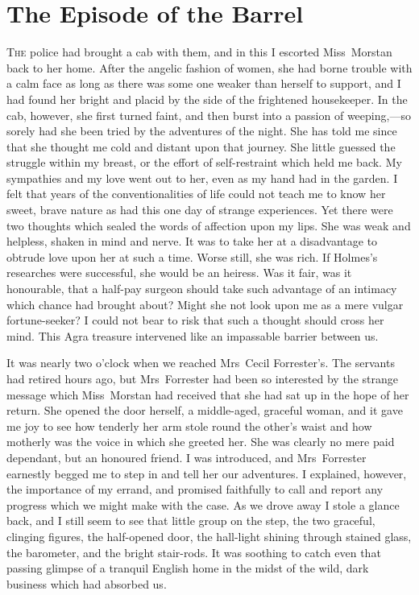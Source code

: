\chapter{The Episode of the Barrel}
\lettrine{T}{he} police had brought a cab with them, and in this I escorted Miss~Morstan back to her home. After the angelic fashion of women, she had borne trouble with a calm face as long as there was some one weaker than herself to support, and I had found her bright and placid by the side of the frightened housekeeper. In the cab, however, she first turned faint, and then burst into a passion of weeping,—so sorely had she been tried by the adventures of the night. She has told me since that she thought me cold and distant upon that journey. She little guessed the struggle within my breast, or the effort of self-restraint which held me back. My sympathies and my love went out to her, even as my hand had in the garden. I felt that years of the conventionalities of life could not teach me to know her sweet, brave nature as had this one day of strange experiences. Yet there were two thoughts which sealed the words of affection upon my lips. She was weak and helpless, shaken in mind and nerve. It was to take her at a disadvantage to obtrude love upon her at such a time. Worse still, she was rich. If Holmes's researches were successful, she would be an heiress. Was it fair, was it honourable, that a half-pay surgeon should take such advantage of an intimacy which chance had brought about? Might she not look upon me as a mere vulgar fortune-seeker? I could not bear to risk that such a thought should cross her mind. This Agra treasure intervened like an impassable barrier between us.

It was nearly two o'clock when we reached Mrs~Cecil Forrester's. The servants had retired hours ago, but Mrs~Forrester had been so interested by the strange message which Miss~Morstan had received that she had sat up in the hope of her return. She opened the door herself, a middle-aged, graceful woman, and it gave me joy to see how tenderly her arm stole round the other's waist and how motherly was the voice in which she greeted her. She was clearly no mere paid dependant, but an honoured friend. I was introduced, and Mrs~Forrester earnestly begged me to step in and tell her our adventures. I explained, however, the importance of my errand, and promised faithfully to call and report any progress which we might make with the case. As we drove away I stole a glance back, and I still seem to see that little group on the step, the two graceful, clinging figures, the half-opened door, the hall-light shining through stained glass, the barometer, and the bright stair-rods. It was soothing to catch even that passing glimpse of a tranquil English home in the midst of the wild, dark business which had absorbed us.

